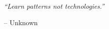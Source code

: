 
\vspace*{\fill}

{\Large\textit{``Learn patterns not technologies.''}}

\begin{flushright}
-- Unknown
\end{flushright}

\vspace*{\fill}
